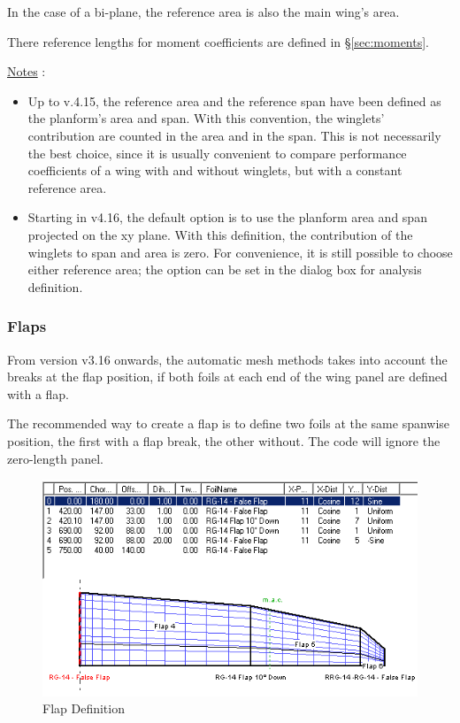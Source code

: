 \documentclass[a4paper,twoside,12pt,dvips]{article}
\begin{document}
In the case of a bi-plane, the reference area is also the main wing's
area.

There reference lengths for moment coefficients are defined in
\S\ref{sec:moments}.

\underline{Notes} :

\begin{itemize}
\item Up to v.4.15, the reference area and the reference span have
been defined as the planform's area and span. With this convention,
the winglets' contribution are counted in the area and in the
span. This is not necessarily the best choice, since it is usually
convenient to compare performance coefficients of a wing with and
without winglets, but with a constant reference area.
\item Starting in v4.16, the default option is to use the planform
area and span projected on the xy plane. With this definition, the
contribution of the winglets to span and area is zero. For
convenience, it is still possible to choose either reference area; the
option can be set in the dialog box for analysis definition.
\end{itemize}

\subsubsection{Flaps}

From version v3.16 onwards, the automatic mesh methods takes into
account the breaks at the flap position, if both foils at each end of
the wing panel are defined with a flap.

The recommended way to create a flap is to define two foils at the same
spanwise position, the first with a flap break, the other without. The
code will ignore the zero-length panel.

\begin{figure}[htbp]
  \includegraphics[width=0.8\linewidth]{img-08}\centering 
  \caption{Flap Definition}
  \label{fig:flap_definition}
\end{figure}
\end{document}
